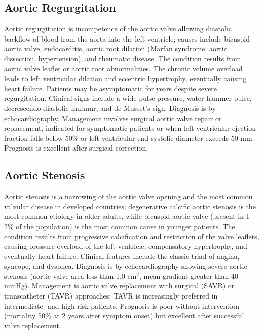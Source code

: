 \subsection{Aortic Regurgitation}
\label{sec:Aortic Regurgitation}
Aortic regurgitation is incompetence of the aortic valve allowing diastolic backflow of blood from the aorta into the left ventricle; causes include bicuspid aortic valve, endocarditis, aortic root dilation (Marfan syndrome, aortic dissection, hypertension), and rheumatic disease. The condition results from aortic valve leaflet or aortic root abnormalities. The chronic volume overload leads to left ventricular dilation and eccentric hypertrophy, eventually causing heart failure. Patients may be asymptomatic for years despite severe regurgitation. Clinical signs include a wide pulse pressure, water-hammer pulse, decrescendo diastolic murmur, and de Musset's sign. Diagnosis is by echocardiography. Management involves surgical aortic valve repair or replacement, indicated for symptomatic patients or when left ventricular ejection fraction falls below 50\% or left ventricular end-systolic diameter exceeds 50 mm. Prognosis is excellent after surgical correction.

\subsection{Aortic Stenosis}
\label{sec:Aortic Stenosis}
Aortic stenosis is a narrowing of the aortic valve opening and the most common valvular disease in developed countries; degenerative calcific aortic stenosis is the most common etiology in older adults, while bicuspid aortic valve (present in 1--2\% of the population) is the most common cause in younger patients. The condition results from progressive calcification and restriction of the valve leaflets, causing pressure overload of the left ventricle, compensatory hypertrophy, and eventually heart failure. Clinical features include the classic triad of angina, syncope, and dyspnea. Diagnosis is by echocardiography showing severe aortic stenosis (aortic valve area less than 1.0 cm$^2$, mean gradient greater than 40 mmHg). Management is aortic valve replacement with surgical (SAVR) or transcatheter (TAVR) approaches; TAVR is increasingly preferred in intermediate- and high-risk patients. Prognosis is poor without intervention (mortality 50\% at 2 years after symptom onset) but excellent after successful valve replacement.

